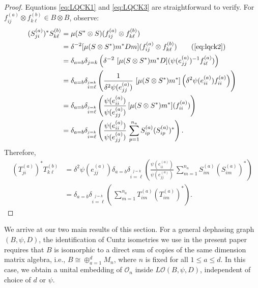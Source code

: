 \documentclass[11pt]{article}
\theoremstyle{plain}
\theoremstyle{nonumberplain}
\theoremstyle{plain}
\theoremstyle{nonumberplain}
\newtheorem{proof}{Proof.}
\newcommand\1{{\bf 1}}
\newcommand\cO{{\mathcal O}}
\newcommand{\<}{\left\langle}
\renewcommand{\>}{\right\rangle}
\begin{document}

\begin{proof}
Equations \ref{eq:LQCK1} and \ref{eq:LQCK3} are straightforward to verify. 
   For $f^{(a)}_{ij}\otimes f^{(b)}_{k\ell}\in B\otimes B$, observe:
    \begin{align*}
        (S^{(a)}_{ji})^* S^{(b)}_{k\ell} 
        &=\mu  (S^*\otimes S)(f^{(a)}_{ij}\otimes f_{k\ell}^{(b)})\\
         &= \displaystyle \delta^{-2} [\mu  (S\otimes S^*)  m^*  D  m](f^{(a)}_{ij}\otimes f_{k\ell}^{(b)}) \tag*{(\ref{eq:lqck2})}\\
        &= \delta_{a=b}\delta_{j=k}\left(\displaystyle \delta^{-2}\,  \,[\mu  (S\otimes S^*)  m^*  D](\psi(e_{jj}^{(a)})^{-1}f^{(a)}_{i\ell})\right)\\
        &= \delta_{a=b}\delta_{\stackrel{j=k}{i=\ell}} \left(\displaystyle \frac{1}{\delta^2 \psi(e_{jj}^{(a)})}\, \,[\mu  (S\otimes S^*)  m^*]\left(\delta^2 \psi(e_{ii}^{(a)})f_{ii}^{(a)}\right)\right)\\
       &=\delta_{a=b} \delta_{\stackrel{j=k}{i=\ell}}  \left(\displaystyle \frac{\psi(e_{ii}^{(a)})}{\psi(e_{jj}^{(a)})} \,[\mu  (S\otimes S^*)  m^*](f^{(a)}_{ii}) \right) \\
        & = \delta_{a=b} \delta_{\stackrel{j=k}{i=\ell}}\left(\displaystyle \frac{\psi(e_{ii}^{(a)})}{\psi(e_{jj}^{(a)})} \,\sum_{p=1}^{n_a}S^{(a)}_{ip}(S^{(a)}_{ip})^*\right).
    \end{align*}
    Therefore,
    \begin{align*}
        (T_{ji}^{(a)})^* T_{k\ell}^{(b)} 
   & = \delta^2 \psi(e_{jj}^{(a)}) \delta_{a=b} \delta_{\stackrel{j=k}{i=\ell}}\left(\displaystyle \frac{\psi(e_{ii}^{(a)})}{\psi(e_{jj}^{(a)})} \,\sum_{m=1}^{n_a}S^{(a)}_{im}(S^{(a)}_{im})^*\right)\\
&    =
    \delta_{a=b} \delta_{\stackrel{j=k}{i=\ell}}\left(\displaystyle \,\sum_{m=1}^{n_a}T^{(a)}_{im}(T^{(a)}_{im})^*\right).
    \end{align*}
\end{proof}


We arrive at our two main results of this section. For a general dephasing graph $(B,\psi,D)$, the identification of Cuntz isometries we use in the present paper requires that $B$ is isomorphic to a direct sum of copies of the same dimension matrix algebra, i.e., $B \cong \oplus_{a=1}^d M_n$, where $n$ is fixed for all $1\leq a\leq d$. In this case, we obtain a unital embedding of $\cO_n$ inside $L\cO(B,\psi,D)$, independent of choice of $d$ or $\psi$.
\end{document}
